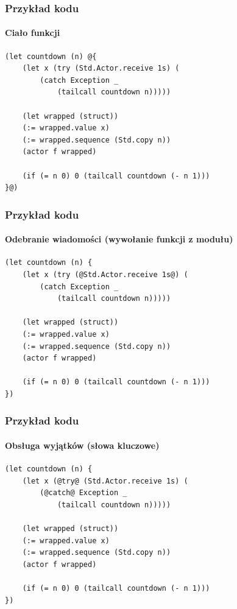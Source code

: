 \documentclass{beamer}
\begin{document}
\begin{frame}[fragile]
    \frametitle{Przykład kodu}
    \framesubtitle{Ciało funkcji}

    \begin{small}
    \begin{lstlisting}
(let countdown (n) @{
    (let x (try (Std.Actor.receive 1s) (
        (catch Exception _
            (tailcall countdown n)))))

    (let wrapped (struct))
    (:= wrapped.value x)
    (:= wrapped.sequence (Std.copy n))
    (actor f wrapped)

    (if (= n 0) 0 (tailcall countdown (- n 1)))
}@)
    \end{lstlisting}
    \end{small}
\end{frame}

\begin{frame}[fragile]
    \frametitle{Przykład kodu}
    \framesubtitle{Odebranie wiadomości (wywołanie funkcji z modułu)}

    \begin{small}
    \begin{lstlisting}
(let countdown (n) {
    (let x (try (@Std.Actor.receive 1s@) (
        (catch Exception _
            (tailcall countdown n)))))

    (let wrapped (struct))
    (:= wrapped.value x)
    (:= wrapped.sequence (Std.copy n))
    (actor f wrapped)

    (if (= n 0) 0 (tailcall countdown (- n 1)))
})
    \end{lstlisting}
    \end{small}
\end{frame}

\begin{frame}[fragile]
    \frametitle{Przykład kodu}
    \framesubtitle{Obsługa wyjątków (słowa kluczowe)}

    \begin{small}
    \begin{lstlisting}
(let countdown (n) {
    (let x (@try@ (Std.Actor.receive 1s) (
        (@catch@ Exception _
            (tailcall countdown n)))))

    (let wrapped (struct))
    (:= wrapped.value x)
    (:= wrapped.sequence (Std.copy n))
    (actor f wrapped)

    (if (= n 0) 0 (tailcall countdown (- n 1)))
})
    \end{lstlisting}
    \end{small}
\end{frame}
\end{document}
